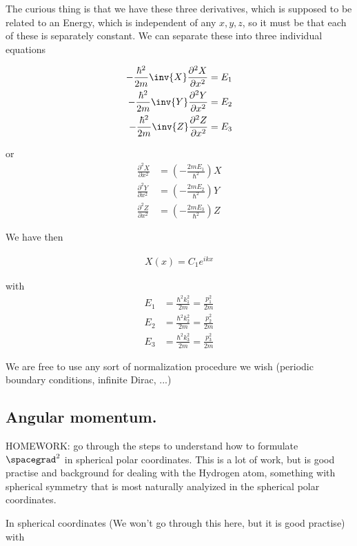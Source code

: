 The curious thing is that we have these three derivatives, which is supposed to be related to an Energy, which is independent of any $x,y,z$, so it must be that each of these is separately constant.  We can separate these into three individual equations

\begin{align*}
-\frac{\hbar^2}{2m} \inv{X} \frac{\partial^2 X}{\partial {x}^2} &= E_1 \\
-\frac{\hbar^2}{2m} \inv{Y} \frac{\partial^2 Y}{\partial {x}^2} &= E_2 \\
-\frac{\hbar^2}{2m} \inv{Z} \frac{\partial^2 Z}{\partial {x}^2} &= E_3
\end{align*}

or
\begin{align*}
\frac{\partial^2 X}{\partial {x}^2} &= \left( - \frac{2m E_1}{\hbar^2} \right) X  \\
\frac{\partial^2 Y}{\partial {x}^2} &= \left( - \frac{2m E_2}{\hbar^2} \right) Y  \\
\frac{\partial^2 Z}{\partial {x}^2} &= \left( - \frac{2m E_3}{\hbar^2} \right) Z 
\end{align*}

We have then

\begin{align*}
X(x) = C_1 e^{i k x}
\end{align*}

with
\begin{align*}
E_1 &= \frac{\hbar^2 k_1^2 }{2m} = \frac{p_1^2}{2m} \\
E_2 &= \frac{\hbar^2 k_2^2 }{2m} = \frac{p_2^2}{2m} \\
E_3 &= \frac{\hbar^2 k_3^2 }{2m} = \frac{p_3^2}{2m} 
\end{align*}

We are free to use any sort of normalization procedure we wish (periodic boundary conditions, infinite Dirac, ...)

\subsection{Angular momentum.}

HOMEWORK: go through the steps to understand how to formulate $\spacegrad^2$ in spherical polar coordinates.  This is a lot of work, but is good practise and background for dealing with the Hydrogen atom, something with spherical symmetry that is most naturally analyized in the spherical polar coordinates.

In spherical coordinates (We won't go through this here, but it is good practise) with

